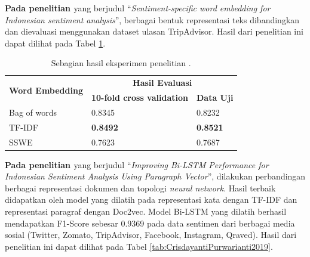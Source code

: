 \textbf{Pada penelitian \parencite{FarhanKhodra2017}} yang berjudul “\textit{Sentiment-specific word embedding for Indonesian sentiment analysis}”, berbagai bentuk representasi teks dibandingkan dan dievaluasi menggunakan dataset ulasan TripAdvisor. Hasil dari penelitian ini dapat dilihat pada Tabel \ref{tab:FarhanKhodra2017}.
\begin{table}[!h]
    \centering
    \caption{Sebagian hasil eksperimen penelitian \parencite{FarhanKhodra2017}.}
    \begin{tabular}{|l|l|l|}
    \hline
    \multicolumn{1}{|c|}{\multirow{2}{*}{\textbf{Word Embedding}}} & \multicolumn{2}{c|}{\textbf{Hasil Evaluasi}}                                                    \\ \cline{2-3} 
    \multicolumn{1}{|c|}{}                                         & \multicolumn{1}{c|}{\textbf{10-fold cross validation}} & \multicolumn{1}{c|}{\textbf{Data Uji}} \\ \hline
    Bag of words                                                   & 0.8345                                                 & 0.8232                                 \\ \hline
    TF-IDF                                                         & \textbf{0.8492}                                        & \textbf{0.8521}                        \\ \hline
    SSWE                                                           & 0.7623                                                 & 0.7687                                 \\ \hline
    \end{tabular}
    \label{tab:FarhanKhodra2017}
\end{table} 

\textbf{Pada penelitian \parencite{CrisdayantiPurwarianti2019}} yang berjudul “\textit{Improving Bi-LSTM Performance for Indonesian Sentiment Analysis Using Paragraph Vector}”, dilakukan perbandingan berbagai representasi dokumen dan topologi \textit{neural network}. Hasil terbaik didapatkan oleh model yang dilatih pada representasi kata dengan TF-IDF dan representasi paragraf dengan Doc2vec. Model Bi-LSTM yang dilatih berhasil mendapatkan F1-Score sebesar 0.9369 pada data sentimen dari berbagai media sosial (Twitter, Zomato, TripAdvisor, Facebook, Instagram, Qraved). Hasil dari penelitian ini dapat dilihat pada Tabel \ref{tab:CrisdayantiPurwarianti2019}.

